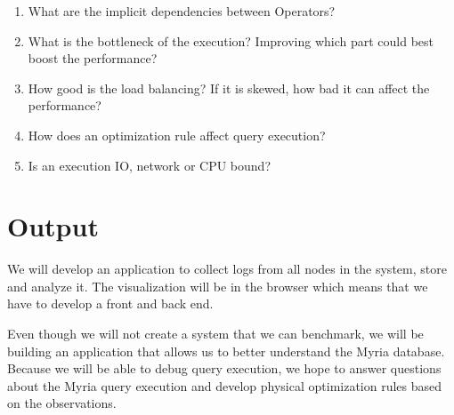 \documentclass[11pt]{article}
\begin{document}
\begin{enumerate}
	\item What are the implicit dependencies between Operators?
	\item What is the bottleneck of the execution? Improving which part could best boost the performance?
	\item How good is the load balancing? If it is skewed, how bad it can affect the performance?
	\item How does an optimization rule affect query execution?
	\item Is an execution IO, network or CPU bound?
\end{enumerate}


\section*{Output}

We will develop an application to collect logs from all nodes in the system, store and analyze it. The visualization will be in the browser which means that we have to develop a front and back end.

Even though we will not create a system that we can benchmark, we will be building an application that allows us to better understand the Myria database. Because we will be able to debug query execution, we hope to answer questions about the Myria query execution and develop physical optimization rules based on the observations.
\end{document}
